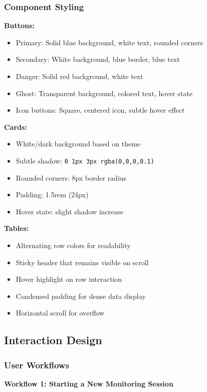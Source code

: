 \subsubsection{Component Styling}

\textbf{Buttons:}
\begin{itemize}
    \item Primary: Solid blue background, white text, rounded corners
    \item Secondary: White background, blue border, blue text
    \item Danger: Solid red background, white text
    \item Ghost: Transparent background, colored text, hover state
    \item Icon buttons: Square, centered icon, subtle hover effect
\end{itemize}

\textbf{Cards:}
\begin{itemize}
    \item White/dark background based on theme
    \item Subtle shadow: \texttt{0 1px 3px rgba(0,0,0,0.1)}
    \item Rounded corners: 8px border radius
    \item Padding: 1.5rem (24px)
    \item Hover state: slight shadow increase
\end{itemize}

\textbf{Tables:}
\begin{itemize}
    \item Alternating row colors for readability
    \item Sticky header that remains visible on scroll
    \item Hover highlight on row interaction
    \item Condensed padding for dense data display
    \item Horizontal scroll for overflow
\end{itemize}

\subsection{Interaction Design}

\subsubsection{User Workflows}

\textbf{Workflow 1: Starting a New Monitoring Session}

